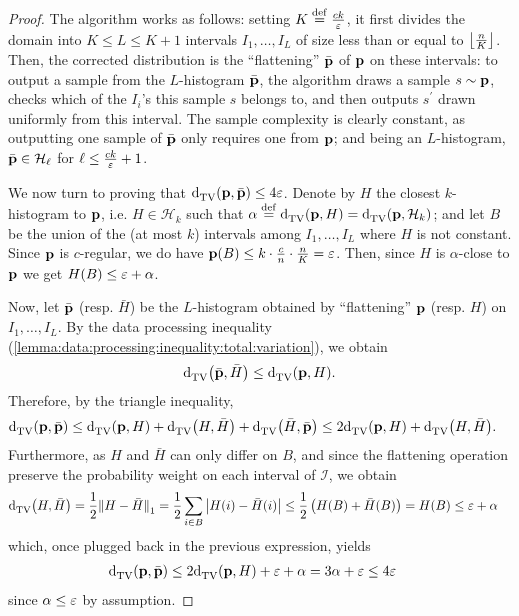 \begin{proof}
  The algorithm works as follows: setting $K\stackrel{\rm def}{=} \frac{ck}{\varepsilon}$, it first divides the domain into $K\leq L\leq K+1$ intervals $I_1,\dots,I_{L}$ of size less than or equal to $\left\lfloor \frac{n}{K} \right\rfloor$. Then, the corrected distribution is the ``flattening'' $\bar{\mathbf{p}}$ of $\mathbf{p}$ on these intervals: to output a sample from the $L$-histogram $\bar{\mathbf{p}}$, the algorithm draws a sample $s\sim\mathbf{p}$, checks which of the $I_i$'s this sample $s$ belongs to, and then outputs $s^\prime$ drawn uniformly from this interval. The sample complexity is clearly constant, as outputting one sample of $\bar{\mathbf{p}}$ only requires one from $\mathbf{p}$; and being an $L$-histogram, $\bar{\mathbf{p}}\in\mathcal{H}_{\ell}$ for $\ell \leq \frac{ck}{\varepsilon}+1$.
  
We now turn to proving that ${\operatorname{d}_{\textrm{TV}}^{}\!\left({\mathbf{p}, \bar{\mathbf{p}}}\right)} \leq 4\varepsilon$. Denote by $H$ the closest $k$-histogram to $\mathbf{p}$, i.e. $H\in\mathcal{H}_k$ such that $\alpha\stackrel{\rm def}{=}{\operatorname{d}_{\textrm{TV}}^{}\!\left({\mathbf{p}, H}\right)}={\operatorname{d}_{\textrm{TV}}^{}\!\left({\mathbf{p}, \mathcal{H}_k}\right)}$; and let $B$ be the union of the (at most $k$) intervals among $I_1,\dots,I_{L}$ where $H$ is not constant. Since $\mathbf{p}$ is $c$-regular, we do have $\mathbf{p}(B) \leq k\cdot\frac{c}{n}\cdot\frac{n}{K} = \varepsilon$. Then, since $H$ is $\alpha$-close to $\mathbf{p}$ we get $H(B) \leq \varepsilon+\alpha$.

Now, let $\bar{\mathbf{p}}$ (resp. $\bar{H}$) be the $L$-histogram obtained by ``flattening'' $\mathbf{p}$ (resp. $H$) on $I_1,\dots,I_{L}$. By the data processing inequality (\cref{lemma:data:processing:inequality:total:variation}), we obtain
\[
    {\operatorname{d}_{\textrm{TV}}^{}\!\left({\bar{\mathbf{p}}, \bar{H}}\right)} \leq {\operatorname{d}_{\textrm{TV}}^{}\!\left({\ensuremath{\mathbf{p}}, H}\right)}.
\]
Therefore, by the triangle inequality,
\begin{align*}
    {\operatorname{d}_{\textrm{TV}}^{}\!\left({\ensuremath{\mathbf{p}}, \bar{\ensuremath{\mathbf{p}}}}\right)} &\leq {\operatorname{d}_{\textrm{TV}}^{}\!\left({\ensuremath{\mathbf{p}}, H}\right)} + {\operatorname{d}_{\textrm{TV}}^{}\!\left({H, \bar{H}}\right)} + {\operatorname{d}_{\textrm{TV}}^{}\!\left({\bar{H}, \bar{\mathbf{p}}}\right)} 
    \leq 2{\operatorname{d}_{\textrm{TV}}^{}\!\left({\mathbf{p}, H}\right)} + {\operatorname{d}_{\textrm{TV}}^{}\!\left({H, \bar{H}}\right)}.
\end{align*}
Furthermore, as $H$ and $\bar{H}$ can only differ on $B$, and since the flattening operation preserve the probability weight on each interval of $\mathcal{I}$, we obtain
\begin{align*}
  {\operatorname{d}_{\textrm{TV}}^{}\!\left({H, \bar{H}}\right)} &= \frac{1}{2}{\lVert H-\bar{H} {\rVert}}_1 = \frac{1}{2}\sum_{i\in B} \left\lvert  H(i) - \bar{H}(i)  \right\rvert 
  \leq \frac{1}{2}\left(H(B) + \bar{H}(B)\right) =H(B) \leq \varepsilon+\alpha
\end{align*}
which, once plugged back in the previous expression, yields
\begin{align*}
    {\operatorname{d}_{\textrm{TV}}^{}\!\left({\ensuremath{\mathbf{p}}, \bar{\ensuremath{\mathbf{p}}}}\right)} &\leq 2{\operatorname{d}_{\textrm{TV}}^{}\!\left({\mathbf{p}, H}\right)} + \varepsilon+\alpha = 3\alpha + \varepsilon 
    \leq 4\varepsilon
\end{align*}
since $\alpha \leq \varepsilon$ by assumption.
\end{proof}
